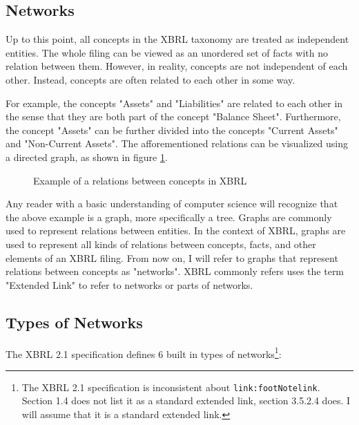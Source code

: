 \subsection{Networks}

Up to this point, all concepts in the XBRL taxonomy are treated as independent entities.
The whole filing can be viewed as an unordered set of facts with no relation between them.
However, in reality, concepts are not independent of each other.
Instead, concepts are often related to each other in some way.

For example, the concepts "Assets" and "Liabilities" are related to each other in the sense that they are both part of the concept "Balance Sheet".
Furthermore, the concept "Assets" can be further divided into the concepts "Current Assets" and "Non-Current Assets".
The afforementioned relations can be visualized using a directed graph, as shown in figure \ref{fig:example_visualization_network_xbrl}.

\begin{figure}[H]
    \caption{Example of a relations between concepts in XBRL}
    \label{fig:example_visualization_network_xbrl}
\end{figure}

Any reader with a basic understanding of computer science will recognize that the above example is a graph, more specifically a tree.
Graphs are commonly used to represent relations between entities.
In the context of XBRL, graphs are used to represent all kinds of relations between concepts, facts, and other elements of an XBRL filing.
From now on, I will refer to graphs that represent relations between concepts as "networks".
XBRL commonly refers uses the term "Extended Link" to refer to networks or parts of networks.

\subsection{Types of Networks}

The XBRL 2.1 specification defines 6 built in types of networks\cite{xbrl21_terminology}\footnote[1]{The XBRL 2.1 specification is inconsistent about \texttt{link:footNotelink}. Section 1.4 does not list it as a standard extended link, section 3.5.2.4 does. I will assume that it is a standard extended link.}:

